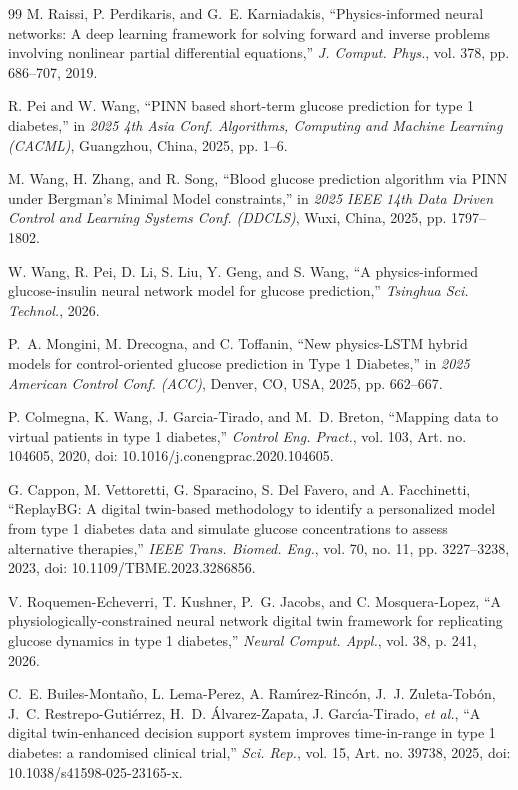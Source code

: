 \documentclass[journal]{IEEEtran}
\begin{document}
\begin{thebibliography}{99}
\label{ref8label} M. Raissi, P. Perdikaris, and G.~E. Karniadakis, ``Physics-informed neural networks: A deep learning framework for solving forward and inverse problems involving nonlinear partial differential equations,'' \emph{J. Comput. Phys.}, vol. 378, pp. 686--707, 2019.

\label{ref9label} R. Pei and W. Wang, ``PINN based short-term glucose prediction for type 1 diabetes,'' in \emph{2025 4th Asia Conf. Algorithms, Computing and Machine Learning (CACML)}, Guangzhou, China, 2025, pp. 1--6.

\label{ref10label} M. Wang, H. Zhang, and R. Song, ``Blood glucose prediction algorithm via PINN under Bergman's Minimal Model constraints,'' in \emph{2025 IEEE 14th Data Driven Control and Learning Systems Conf. (DDCLS)}, Wuxi, China, 2025, pp. 1797--1802.

\label{ref11label} W. Wang, R. Pei, D. Li, S. Liu, Y. Geng, and S. Wang, ``A physics-informed glucose-insulin neural network model for glucose prediction,'' \emph{Tsinghua Sci. Technol.}, 2026.

\label{ref12label} P.~A. Mongini, M. Drecogna, and C. Toffanin, ``New physics-LSTM hybrid models for control-oriented glucose prediction in Type 1 Diabetes,'' in \emph{2025 American Control Conf. (ACC)}, Denver, CO, USA, 2025, pp. 662--667.

\label{ref13label} P. Colmegna, K. Wang, J. Garcia-Tirado, and M.~D. Breton, ``Mapping data to virtual patients in type 1 diabetes,'' \emph{Control Eng. Pract.}, vol. 103, Art. no. 104605, 2020, doi: 10.1016/j.conengprac.2020.104605.

\label{ref14label} G. Cappon, M. Vettoretti, G. Sparacino, S. Del Favero, and A. Facchinetti, ``ReplayBG: A digital twin-based methodology to identify a personalized model from type 1 diabetes data and simulate glucose concentrations to assess alternative therapies,'' \emph{IEEE Trans. Biomed. Eng.}, vol. 70, no. 11, pp. 3227--3238, 2023, doi: 10.1109/TBME.2023.3286856.

\label{ref16label} V. Roquemen-Echeverri, T. Kushner, P.~G. Jacobs, and C. Mosquera-Lopez, ``A physiologically-constrained neural network digital twin framework for replicating glucose dynamics in type 1 diabetes,'' \emph{Neural Comput. Appl.}, vol. 38, p. 241, 2026.

\label{ref17label} C.~E. Builes-Monta\~no, L. Lema-Perez, A. Ram\'{\i}rez-Rinc\'on, J.~J. Zuleta-Tob\'on, J.~C. Restrepo-Guti\'errez, H.~D. \'Alvarez-Zapata, J. Garc\'{\i}a-Tirado, \emph{et al.}, ``A digital twin-enhanced decision support system improves time-in-range in type 1 diabetes: a randomised clinical trial,'' \emph{Sci. Rep.}, vol. 15, Art. no. 39738, 2025, doi: 10.1038/s41598-025-23165-x.


\end{thebibliography}
\end{document}
